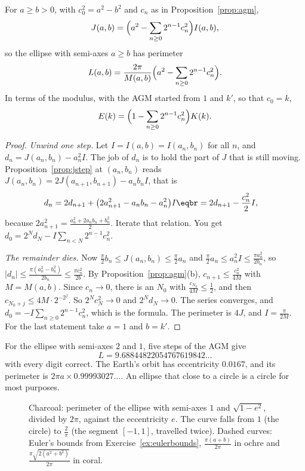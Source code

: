 \begin{theorem}\label{thm:perimeter}
For $a\ge b>0$, with $c_0^2=a^2-b^2$ and $c_n$ as in Proposition~\ref{prop:agm},
\[
J(a,b)=\Bigl(a^2-\sum_{n\ge0}2^{n-1}c_n^2\Bigr)I(a,b),
\]
so the ellipse with semi-axes $a\ge b$ has perimeter
\[
L(a,b)=\frac{2\pi}{M(a,b)}\Bigl(a^2-\sum_{n\ge0}2^{n-1}c_n^2\Bigr).
\]
In terms of the modulus, with the AGM started from $1$ and $k'$, so that $c_0=k$,
\[
E(k)=\Bigl(1-\sum_{n\ge0}2^{n-1}c_n^2\Bigr)K(k).
\]
\end{theorem}
\begin{proof}
\emph{Unwind one step.} Let $I=I(a,b)=I(a_n,b_n)$ for all $n$, and $d_n=J(a_n,b_n)-a_n^2I$. The job of $d_n$ is to hold the part of $J$ that is still moving. Proposition~\ref{prop:jstep} at $(a_n,b_n)$ reads $J(a_n,b_n)=2J(a_{n+1},b_{n+1})-a_nb_nI$, that is
\[
\begin{aligned}d_n&=2d_{n+1}+\bigl(2a_{n+1}^2-a_nb_n-a_n^2\bigr)I\eqbr=2d_{n+1}-\frac{c_n^2}2I,\end{aligned}
\]
because $2a_{n+1}^2=\frac{a_n^2+2a_nb_n+b_n^2}2$. Iterate that relation. You get $d_0=2^Nd_N-I\sum_{n<N}2^{n-1}c_n^2$.

\emph{The remainder dies.} Now $\frac\pi2b_n\le J(a_n,b_n)\le\frac\pi2a_n$ and $\frac\pi2a_n\le a_n^2I\le\frac{\pi a_n^2}{2b_n}$, so $|d_n|\le\frac{\pi(a_n^2-b_n^2)}{2b_n}\le\frac{\pi c_n^2}{2b}$. By Proposition~\ref{prop:agm}(b), $c_{n+1}\le\frac{c_n^2}{4M}$ with $M=M(a,b)$. Since $c_n\to0$, there is an $N_0$ with $\frac{c_{N_0}}{4M}\le\frac12$, and then $c_{N_0+j}\le4M\cdot2^{-2^j}$. So $2^Nc_N^2\to0$ and $2^Nd_N\to0$. The series converges, and $d_0=-I\sum_{n\ge0}2^{n-1}c_n^2$, which is the formula. The perimeter is $4J$, and $I=\frac\pi{2M}$. For the last statement take $a=1$ and $b=k'$.
\end{proof}

For the ellipse with semi-axes $2$ and $1$, five steps of the AGM give
\[
L=9.68844822054767619842\ldots
\]
with every digit correct. The Earth's orbit has eccentricity $0.0167$, and its perimeter is $2\pi a\times0.99993027\ldots$. An ellipse that close to a circle is a circle for most purposes.

\begin{figure}[ht]
\centering
{}
\caption{Charcoal: perimeter of the ellipse with semi-axes $1$ and $\sqrt{1-e^2}$, divided by $2\pi$, against the eccentricity $e$. The curve falls from $1$ (the circle) to
$\frac2\pi$ (the segment $[-1,1]$, travelled twice). Dashed curves: Euler's bounds from Exercise~\ref{ex:eulerbounds}, $\frac{\pi(a+b)}{2\pi}$ in ochre and $\frac{\pi\sqrt{2(a^2+b^2)}}{2\pi}$ in coral.}
\label{fig:perimeter}
\end{figure}

